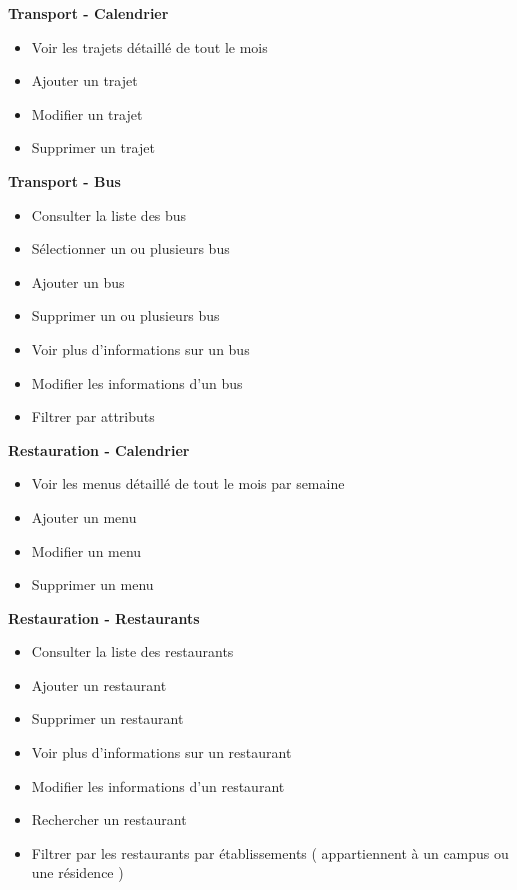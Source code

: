     \textbf{Transport - Calendrier}
    \begin{itemize}
        \item Voir les trajets détaillé de tout le mois
        \item Ajouter un trajet
        \item Modifier un trajet
        \item Supprimer un trajet \\
    \end{itemize}

    \textbf{Transport - Bus}
    \begin{itemize}
        \item Consulter la liste des bus
        \item Sélectionner un ou plusieurs bus
        \item Ajouter un bus
        \item Supprimer un ou plusieurs bus
        \item Voir plus d'informations sur un bus
        \item Modifier les informations d'un bus
        \item Filtrer par attributs \\
    \end{itemize}

    \textbf{Restauration - Calendrier}
    \begin{itemize}
        \item Voir les menus détaillé de tout le mois par semaine
        \item Ajouter un menu
        \item Modifier un menu
        \item Supprimer un menu \\
    \end{itemize}

    \textbf{Restauration - Restaurants}
    \begin{itemize}
        \item Consulter la liste des restaurants
        \item Ajouter un restaurant
        \item Supprimer un restaurant
        \item Voir plus d'informations sur un restaurant
        \item Modifier les informations d'un restaurant
        \item Rechercher un restaurant
        \item Filtrer par les restaurants par établissements ( appartiennent à un campus ou une résidence )\\
    \end{itemize}


